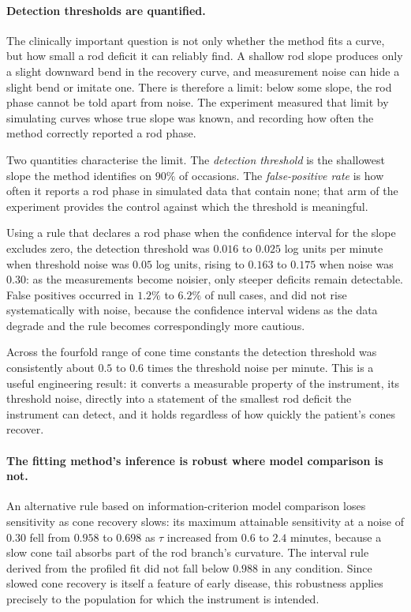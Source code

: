 \documentclass[11pt,a4paper]{article}
\begin{document}
\paragraph{Detection thresholds are quantified.}
The clinically important question is not only whether the method fits a
curve, but how small a rod deficit it can reliably find. A shallow rod
slope produces only a slight downward bend in the recovery curve, and
measurement noise can hide a slight bend or imitate one. There is
therefore a limit: below some slope, the rod phase cannot be told apart
from noise. The experiment measured that limit by simulating curves whose
true slope was known, and recording how often the method correctly
reported a rod phase.

Two quantities characterise the limit. The \emph{detection threshold} is
the shallowest slope the method identifies on $90\%$ of occasions. The
\emph{false-positive rate} is how often it reports a rod phase in
simulated data that contain none; that arm of the experiment provides the
control against which the threshold is meaningful.

Using a rule that declares a rod phase when the confidence interval for
the slope excludes zero, the detection threshold was $0.016$ to $0.025$
log units per minute when threshold noise was $0.05$ log units, rising to
$0.163$ to $0.175$ when noise was $0.30$: as the measurements become
noisier, only steeper deficits remain detectable. False positives
occurred in $1.2\%$ to $6.2\%$ of null cases, and did not rise
systematically with noise, because the confidence interval widens as the
data degrade and the rule becomes correspondingly more cautious.

Across the fourfold range of cone time constants the detection threshold
was consistently about $0.5$ to $0.6$ times the threshold noise per
minute. This is a useful engineering result: it converts a measurable
property of the instrument, its threshold noise, directly into a
statement of the smallest rod deficit the instrument can detect, and it
holds regardless of how quickly the patient's cones recover.

\paragraph{The fitting method's inference is robust where model
comparison is not.}
An alternative rule based on information-criterion model comparison loses
sensitivity as cone recovery slows: its maximum attainable sensitivity at
a noise of $0.30$ fell from $0.958$ to $0.698$ as $\tau$ increased from
$0.6$ to $2.4$ minutes, because a slow cone tail absorbs part of the rod
branch's curvature. The interval rule derived from the profiled fit did
not fall below $0.988$ in any condition. Since slowed cone recovery is
itself a feature of early disease, this robustness applies precisely to
the population for which the instrument is intended.
\end{document}
